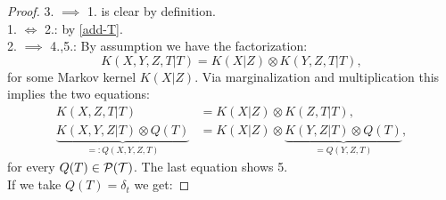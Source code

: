 \begin{Thm}
\begin{enumerate}[resume]
\end{enumerate}
\begin{proof}
    3. $\implies$ 1. is clear by definition.\\
    1. $\iff$ 2.: by \ref{add-T}.\\
    2. $\implies$ 4.,5.:
    By assumption we have the factorization:
    \[K(X,Y,Z,T|T) = K(X|Z) \otimes K(Y,Z,T|T),\]
    for some Markov kernel $K(X|Z)$. Via marginalization and multiplication this implies the two equations:
    \begin{align*}
        K(X,Z,T|T)            &= K(X|Z) \otimes K(Z,T|T),\\
        \underbrace{K(X,Y,Z|T)\otimes Q(T)}_{=:Q(X,Y,Z,T)} &= K(X|Z) \otimes \underbrace{K(Y,Z|T) \otimes Q(T)}_{=Q(Y,Z,T)},
    \end{align*}
    for every $Q(T) \in \mathcal{P}(\mathcal{T})$. The last equation shows 5.\\ 
    If we take $Q(T)=\delta_t$ we get:

\end{proof}
\end{Thm}
